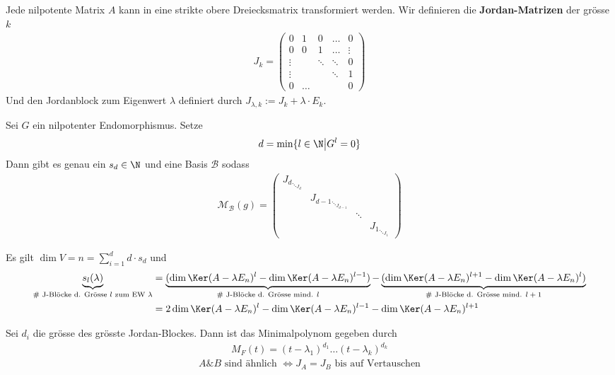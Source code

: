 Jede nilpotente Matrix $A$ kann in eine strikte obere Dreiecksmatrix transformiert werden. Wir definieren die \textbf{Jordan-Matrizen} der grösse $k$
\begin{align*}
    J_k = \begin{pmatrix}
        0 & 1 & 0 & \dots & 0\\
        0 & 0 & 1 & \dots & \vdots\\
        \vdots & & \ddots & \ddots & 0\\
        \vdots & & & \ddots & 1\\
        0 & \dots & & & 0
    \end{pmatrix}
\end{align*}
Und den Jordanblock zum Eigenwert $\lambda$ definiert durch $J_{\lambda,k} := J_k + \lambda \cdot E_k$.

\begin{satz}{}
    Sei $G$ ein nilpotenter Endomorphismus. Setze
    \begin{align*}
        d = \min \{l \in \N \big\vert G^l = 0\}
    \end{align*}
    Dann gibt es genau ein $s_d \in \N$ und eine Basis $\mathcal{B}$ sodass
    \begin{align*}
        \mathcal{M}_{\mathcal{B}}(g) = \begin{pmatrix}
            {J_d}_{\ddots_{ J_d}}\\
            & {J_{d-1}}_{\ddots_{J_{d-1}}}\\
            & & \ddots \\
            & & & {J_1}_{\ddots_{J_1}}
        \end{pmatrix}
    \end{align*}
\end{satz}

Es gilt $\dim V = n = \sum_{i = 1}^{d} d \cdot s_d$ und
\begin{align*}
    \underbrace{s_l(\lambda)}_{\text{\# J-Blöcke d. Grösse $l$ zum EW $\lambda$}} &= \underbrace{(\dim\Ker(A - \lambda E_n)^l - \dim \Ker(A - \lambda E_n)^{l-1})}_{\text{\# J-Blöcke d. Grösse mind. $l$}} - \underbrace{(\dim \Ker (A - \lambda E_n)^{l+1} - \dim \Ker(A - \lambda E_n)^l)}_{\text{\# J-Blöcke d. Grösse mind. $l+1$}}\\
    &=  2 \dim \Ker (A - \lambda E_n)^l - \dim \Ker (A - \lambda E_n)^{l-1} - \dim \Ker (A - \lambda E_n)^{l+1}
\end{align*}

Sei $d_{i}$ die grösse des grösste Jordan-Blockes.  Dann ist das Minimalpolynom gegeben durch
\begin{align*}
    M_F(t) = (t - \lambda_1)^{d_1} \dots (t - \lambda_k)^{d_k}
\end{align*}
\begin{align*}
    A \& B \text{ sind ähnlich } \Leftrightarrow J_A = J_B \text{ bis auf Vertauschen}
\end{align*}

